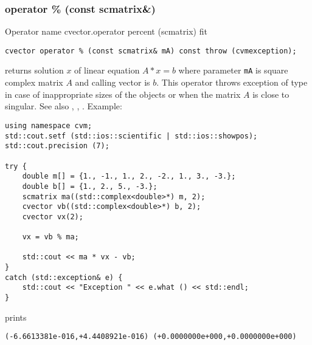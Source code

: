 \subsubsection{operator \% (const scmatrix\&)}
Operator%
\pdfdest name {cvector.operator percent (scmatrix)} fit
\begin{verbatim}
cvector operator % (const scmatrix& mA) const throw (cvmexception);
\end{verbatim}
returns solution $x$ of linear equation
$A*x=b$ where parameter \verb"mA" is  square complex matrix $A$
and calling vector is $b$.
This operator throws exception 
of type 
in case of inappropriate sizes
of the objects or when the matrix $A$ is close to singular.
See also , , .
Example:
\begin{Verbatim}
using namespace cvm;
std::cout.setf (std::ios::scientific | std::ios::showpos);
std::cout.precision (7);

try {
    double m[] = {1., -1., 1., 2., -2., 1., 3., -3.};
    double b[] = {1., 2., 5., -3.};
    scmatrix ma((std::complex<double>*) m, 2);
    cvector vb((std::complex<double>*) b, 2);
    cvector vx(2);

    vx = vb % ma;

    std::cout << ma * vx - vb;
}
catch (std::exception& e) {
    std::cout << "Exception " << e.what () << std::endl;
}
\end{Verbatim}
prints
\begin{Verbatim}
(-6.6613381e-016,+4.4408921e-016) (+0.0000000e+000,+0.0000000e+000)
\end{Verbatim}
\newpage





